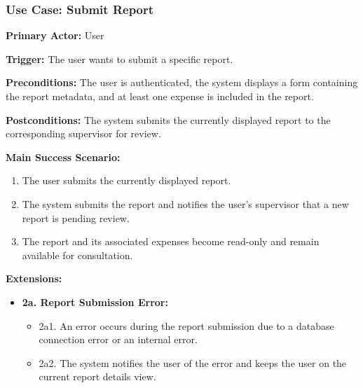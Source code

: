 \subsubsection{\textbf{Use Case: Submit Report}}

\textbf{Primary Actor:} User

\textbf{Trigger:} The user wants to submit a specific report.

\textbf{Preconditions:} The user is authenticated, the system displays a form containing the report metadata, and at least one expense is included in the report.

\textbf{Postconditions:} The system submits the currently displayed report to the corresponding supervisor for review.

\vspace{0.5cm}

\textbf{Main Success Scenario:}

\begin{enumerate} [leftmargin=0.75cm, noitemsep]
\item The user submits the currently displayed report.
\item The system submits the report and notifies the user’s supervisor that a new report is pending review.
\item The report and its associated expenses become read-only and remain available for consultation.
\end{enumerate}

\vspace{0.3cm}

\textbf{Extensions:}

\begin{itemize} [label={}, leftmargin=0.75cm, noitemsep]

    \item \textbf{2a. Report Submission Error:}
    \begin{itemize} [label={}, leftmargin=0.75cm, noitemsep]
        \item 2a1. An error occurs during the report submission due to a database connection error or an internal error.
        \item 2a2. The system notifies the user of the error and keeps the user on the current report details view.
    \end{itemize}

\end{itemize}

\vspace{0.3cm}
